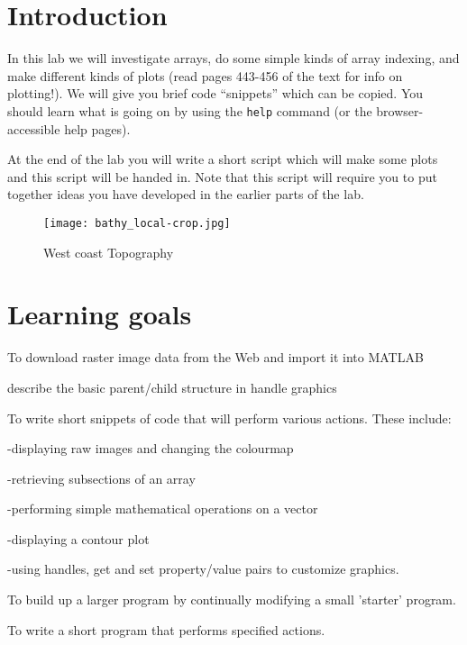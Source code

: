 \documentclass[letterpaper,10pt]{article}
\newcounter{lnum}
\newenvironment{abbrevlist}%
  {\begin{list}{(\arabic{lnum})}{\setlength{\leftmargin}{1em}%
               \setlength{\itemindent}{3em}%
               \setlength{\itemsep}{0pt}%
               \setlength{\parsep}{0pt}%
               \setlength{\topsep}{2pt}%
               \usecounter{lnum} } }{\end{list}}
\begin{document}
\section{Introduction}

In this lab we will investigate arrays, do some simple kinds of array
indexing, and make different kinds of plots (read pages 443-456 of the text for info on plotting!). 
We will give you brief code ``snippets'' 
which can be copied. You should learn what is going on by using 
the \verb+help+ command (or the browser-accessible help pages).

At the end of the lab you will
write a short script which will make some plots and this script will be
handed in. Note that this script will require you to put together ideas
you have developed in the earlier parts of the lab.

\begin{figure}[h]
\vspace{10pt}
\centering
\texttt{[image: bathy\_local-crop.jpg]}
\caption{West coast Topography}
\label{f1}
\end{figure}

\section*{Learning goals}
\begin{abbrevlist}
\item  To  download raster image data from the Web and import it into MATLAB
\item  describe the basic parent/child structure in handle graphics
\item  To write short snippets of code that will perform various actions. These include:
\begin{abbrevlist}
\item -displaying raw images and changing the colourmap
\item -retrieving subsections of an array
\item -performing simple mathematical operations on a vector
\item -displaying a contour plot
\item -using handles, get and set property/value pairs to customize graphics.
\end{abbrevlist}
\item  To build up a larger program by continually modifying a small 'starter' program.
\item  To write a short program that performs specified actions.  

\end{abbrevlist}
\end{document}
